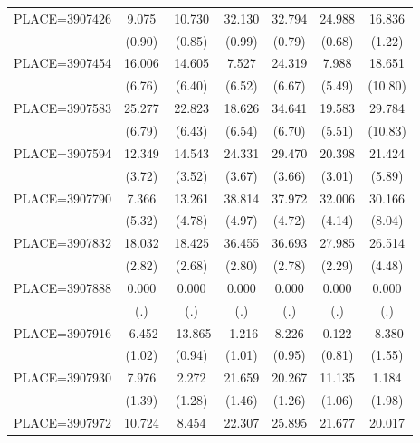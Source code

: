 {\begin{tabular}{l*{6}{c}}
PLACE=3907426       &       9.075&      10.730&      32.130&      32.794&      24.988&      16.836\\
                    &      (0.90)&      (0.85)&      (0.99)&      (0.79)&      (0.68)&      (1.22)\\
PLACE=3907454       &      16.006&      14.605&       7.527&      24.319&       7.988&      18.651\\
                    &      (6.76)&      (6.40)&      (6.52)&      (6.67)&      (5.49)&     (10.80)\\
PLACE=3907583       &      25.277&      22.823&      18.626&      34.641&      19.583&      29.784\\
                    &      (6.79)&      (6.43)&      (6.54)&      (6.70)&      (5.51)&     (10.83)\\
PLACE=3907594       &      12.349&      14.543&      24.331&      29.470&      20.398&      21.424\\
                    &      (3.72)&      (3.52)&      (3.67)&      (3.66)&      (3.01)&      (5.89)\\
PLACE=3907790       &       7.366&      13.261&      38.814&      37.972&      32.006&      30.166\\
                    &      (5.32)&      (4.78)&      (4.97)&      (4.72)&      (4.14)&      (8.04)\\
PLACE=3907832       &      18.032&      18.425&      36.455&      36.693&      27.985&      26.514\\
                    &      (2.82)&      (2.68)&      (2.80)&      (2.78)&      (2.29)&      (4.48)\\
PLACE=3907888       &       0.000&       0.000&       0.000&       0.000&       0.000&       0.000\\
                    &         (.)&         (.)&         (.)&         (.)&         (.)&         (.)\\
PLACE=3907916       &      -6.452&     -13.865&      -1.216&       8.226&       0.122&      -8.380\\
                    &      (1.02)&      (0.94)&      (1.01)&      (0.95)&      (0.81)&      (1.55)\\
PLACE=3907930       &       7.976&       2.272&      21.659&      20.267&      11.135&       1.184\\
                    &      (1.39)&      (1.28)&      (1.46)&      (1.26)&      (1.06)&      (1.98)\\
PLACE=3907972       &      10.724&       8.454&      22.307&      25.895&      21.677&      20.017\\

\end{tabular}}
